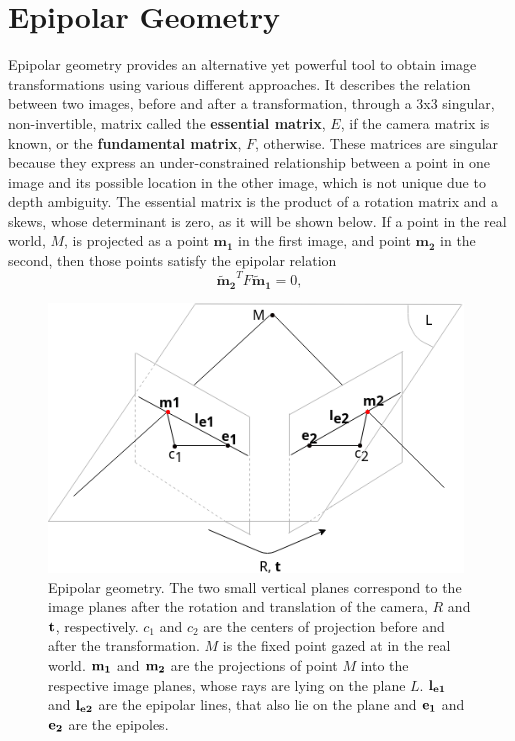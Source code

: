
\section{Epipolar Geometry}
\label{cha2:epipolar}

Epipolar geometry provides an alternative yet powerful tool to obtain image transformations using various different approaches. It describes the relation between two images, before and after a transformation, through a 3x3 singular, non-invertible, matrix called the \textbf{essential matrix}, \textbf{$E$}, if the camera matrix is known, or the \textbf{fundamental matrix}, \textbf{$F$}, otherwise. These matrices are singular because they express an under-constrained relationship between a point in one image and its possible location in the other image, which is not unique due to depth ambiguity. The essential matrix is the product of a rotation matrix and a \gls{skews}, whose determinant is zero, as it will be shown below. If a point in the real world, $M$, is projected as a point $\mathbf{{m}_1}$ in the first image, and point $\mathbf{{m}_2}$ in the second, then those points satisfy the epipolar relation
\begin{equation}
\label{sec2:eq:epipolar}
\mathbf{\tilde{m}_2}^T F \mathbf{\tilde{m}_1} = 0,
\end{equation}
\begin{figure}[h]
	\centering
	\includegraphics[width=11cm]{images/epipolargeo.png}
	\caption[Epipolar geometry]{Epipolar geometry. The two small vertical planes correspond to the image planes after the rotation and translation of the camera, $R$ and $\bf t$, respectively. $c_1$ and $c_2$ are the centers of projection before and after the transformation. $M$ is the fixed point gazed at in the real world. $\bf m_1$ and $\bf m_2$ are the projections of point $M$ into the respective image planes, whose rays are lying on the plane $L$. $\bf l_{e1}$ and $\bf l_{e2}$ are the epipolar lines, that also lie on the plane and $\bf e_1$ and $\bf e_2$ are the epipoles.}
	\label{sec2:fig:epipolargeo}
\end{figure}
